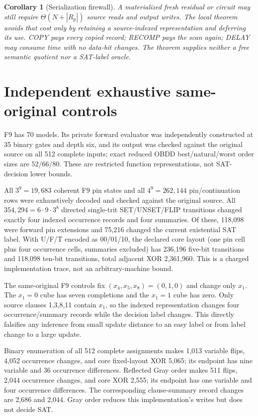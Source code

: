 \documentclass[11pt]{article}
\newtheorem{corollary}{Corollary}
\begin{document}
\begin{corollary}[Serialization firewall]
A materialized fresh residual or circuit may still require $\Theta(N+|R_p|)$ source reads and output writes. The local theorem avoids that cost only by retaining a source-indexed representation and deferring its use. COPY pays every copied record; RECOMP pays the scan again; DELAY may consume time with no data-bit changes. The theorem supplies neither a free semantic quotient nor a SAT-label oracle.
\end{corollary}

\section{Independent exhaustive same-original controls}
F9 has 70 models. Its private forward evaluator was independently constructed at 35 binary gates and depth six, and its output was checked against the original source on all 512 complete inputs; exact reduced OBDD best/natural/worst order sizes are $52/66/80$. These are restricted function representations, not SAT-decision lower bounds.

All $3^9=19{,}683$ coherent F9 pin states and all $4^9=262{,}144$ pin/continuation rows were exhaustively decoded and checked against the original source. All $354{,}294=6\cdot9\cdot3^8$ directed single-trit SET/UNSET/FLIP transitions changed exactly four indexed occurrence records and four summaries. Of these, 118,098 were forward pin extensions and 75,216 changed the current existential SAT label. With U/F/T encoded as 00/01/10, the declared core layout (one pin cell plus four occurrence cells, summaries excluded) has 236,196 five-bit transitions and 118,098 ten-bit transitions, total adjacent XOR 2,361,960. This is a charged implementation trace, not an arbitrary-machine bound.

The same-original F9 controls fix $(x_4,x_5,x_8)=(0,1,0)$ and change only $x_1$. The $x_1=0$ cube has seven completions and the $x_1=1$ cube has zero. Only source clauses 1,3,8,11 contain $x_1$, so the indexed representation changes four occurrence/summary records while the decision label changes. This directly falsifies any inference from small update distance to an easy label or from label change to a large update.

Binary enumeration of all 512 complete assignments makes 1,013 variable flips, 4,052 occurrence changes, and core fixed-layout XOR 5,065; its endpoint has nine variable and 36 occurrence differences. Reflected Gray order makes 511 flips, 2,044 occurrence changes, and core XOR 2,555; its endpoint has one variable and four occurrence differences. The corresponding clause-summary record changes are 2,686 and 2,044. Gray order reduces this implementation's writes but does not decide SAT.
\end{document}
